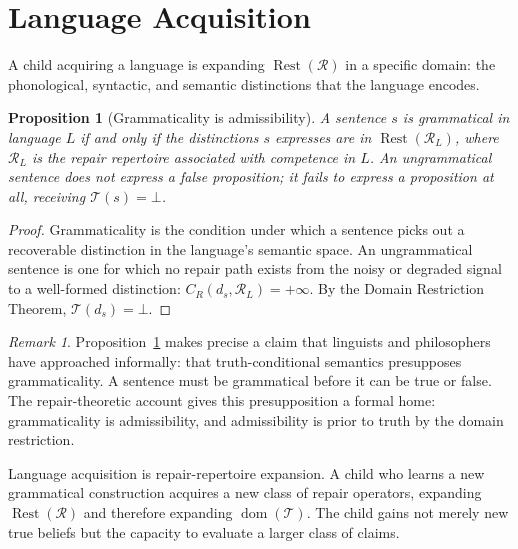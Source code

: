 \documentclass[12pt, oneside]{article}
\theoremstyle{plain}
\newtheorem{proposition}[theorem]{Proposition}
\theoremstyle{definition}
\theoremstyle{remark}
\newtheorem{remark}[theorem]{Remark}
\DeclareMathOperator{\Rest}{Rest}
\newcommand{\CR}{C_{\!R}}
\newcommand{\Tsub}{\mathcal{T}}
\newcommand{\RestR}{\Rest(\mathcal{R})}
\newcommand{\Undef}{\mathord{\perp}} %
\begin{document}
\section{Language Acquisition}
\label{sec:language}

A child acquiring a language is expanding $\RestR$ in a specific
domain: the phonological, syntactic, and semantic distinctions
that the language encodes.

\begin{proposition}[Grammaticality is admissibility]
  A sentence $s$ is grammatical in language $L$ if and only if
  the distinctions $s$ expresses are in $\Rest(\mathcal{R}_L)$,
  where $\mathcal{R}_L$ is the repair repertoire associated with
  competence in $L$.
  An ungrammatical sentence does not express a false proposition;
  it fails to express a proposition at all, receiving $\Tsub(s)
  = \Undef$.
  \label{prop:grammar}
\end{proposition}

\begin{proof}
  Grammaticality is the condition under which a sentence picks out
  a recoverable distinction in the language's semantic space.
  An ungrammatical sentence is one for which no repair path exists
  from the noisy or degraded signal to a well-formed distinction:
  $\CR(d_s, \mathcal{R}_L) = +\infty$.
  By the Domain Restriction Theorem, $\Tsub(d_s) = \Undef$.
\end{proof}

\begin{remark}
  Proposition~\ref{prop:grammar} makes precise a claim that
  linguists and philosophers have approached informally: that
  truth-conditional semantics presupposes grammaticality.
  A sentence must be grammatical before it can be true or false.
  The repair-theoretic account gives this presupposition a
  formal home: grammaticality is admissibility, and admissibility
  is prior to truth by the domain restriction.

  Language acquisition is repair-repertoire expansion.
  A child who learns a new grammatical construction acquires a
  new class of repair operators, expanding $\RestR$ and therefore
  expanding $\operatorname{dom}(\Tsub)$.
  The child gains not merely new true beliefs but the capacity
  to evaluate a larger class of claims.
\end{remark}


\end{document}
